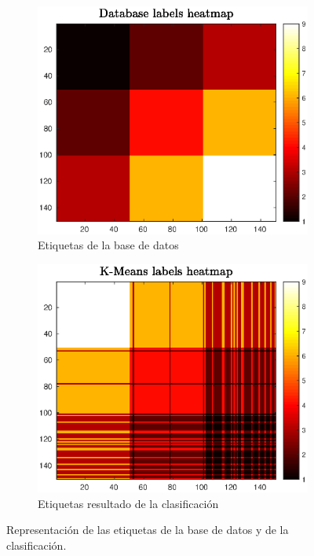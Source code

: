 \documentclass[11pt]{article} %
\begin{document}
\begin{figure}[h]
    \centering
    \begin{subfigure}[b]{0.435\textwidth}
        \includegraphics[width=\textwidth]{../src/fig/23_db_heatmap.eps}
        \caption[]{Etiquetas de la base de datos}
        \label{fig:23:heatmap:db}
    \end{subfigure}
    \quad
    \begin{subfigure}[b]{0.435\textwidth}
        \includegraphics[width=\textwidth]{../src/fig/23_kmeans_heatmap.eps}
        \caption[]{Etiquetas resultado de la clasificación}
        \label{fig:23:heatmap:kmeans}
    \end{subfigure}
    \caption{Representación de las etiquetas de la base de datos y de la
        clasificación.}
     \label{fig:23:heatmap}
\end{figure}
\end{document}
